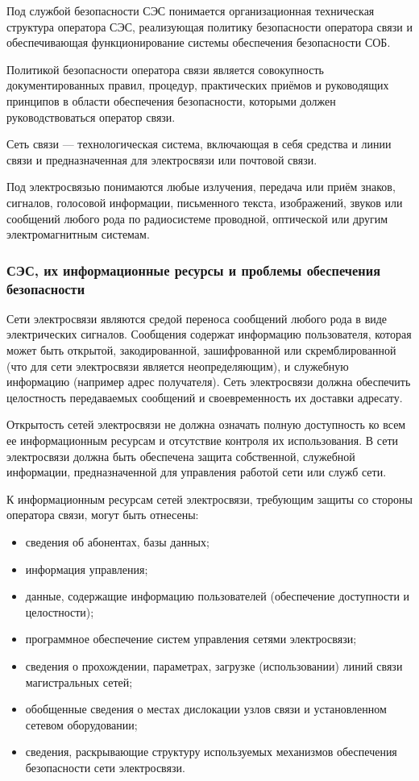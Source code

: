 \documentclass[12pt, russian, oneside, article]{ncc}
\begin{document}
Под службой безопасности СЭС понимается организационная техническая структура оператора СЭС, реализующая политику безопасности оператора связи и обеспечивающая функционирование системы обеспечения безопасности СОБ.

Политикой безопасности оператора связи является совокупность документированных правил, процедур, практических приёмов и руководящих принципов в области обеспечения безопасности, которыми должен руководствоваться оператор связи.

Сеть связи --- технологическая система, включающая в себя средства и линии связи и предназначенная для электросвязи или почтовой связи.

Под электросвязью понимаются любые излучения, передача или приём знаков, сигналов, голосовой информации, письменного текста, изображений, звуков или сообщений любого рода по радиосистеме проводной, оптической или другим электромагнитным системам.
\subsubsection{СЭС, их информационные ресурсы и проблемы обеспечения безопасности}
\label{sec-1_1_2}


Сети электросвязи являются средой переноса сообщений любого рода в виде электрических сигналов. Сообщения содержат информацию пользователя, которая может быть открытой, закодированной, зашифрованной или скремблированной (что для сети электросвязи является неопределяющим), и служебную информацию (например адрес получателя). Сеть электросвязи должна обеспечить целостность передаваемых сообщений и своевременность их доставки адресату.

Открытость сетей электросвязи не должна означать полную доступность ко всем ее информационным ресурсам и отсутствие контроля их использования. В сети электросвязи должна быть обеспечена защита собственной, служебной информации, предназначенной для управления работой сети или служб сети.

К информационным ресурсам сетей электросвязи, требующим защиты со стороны оператора связи, могут быть отнесены:
\begin{itemize}
\item сведения об абонентах, базы данных;
\item информация управления;
\item данные, содержащие информацию пользователей (обеспечение доступности и целостности);
\item программное обеспечение систем управления сетями электросвязи;
\item сведения о прохождении, параметрах, загрузке (использовании) линий связи магистральных сетей;
\item обобщенные сведения о местах дислокации узлов связи и установленном сетевом оборудовании;
\item сведения, раскрывающие структуру используемых механизмов обеспечения безопасности сети электросвязи.
\end{itemize}
\end{document}
